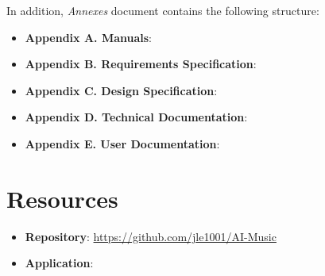 In addition, \textit{Annexes} document contains the following structure:

\begin{itemize}
\tightlist
\item \textbf{Appendix A. Manuals}:
\item \textbf{Appendix B. Requirements Specification}:
\item \textbf{Appendix C. Design Specification}:
\item \textbf{Appendix D. Technical Documentation}:
\item \textbf{Appendix E. User Documentation}:
\end{itemize}

\section{Resources}

\begin{itemize}
\tightlist
\item \textbf{Repository}: \url{https://github.com/jle1001/AI-Music}
\item \textbf{Application}:
\end{itemize}